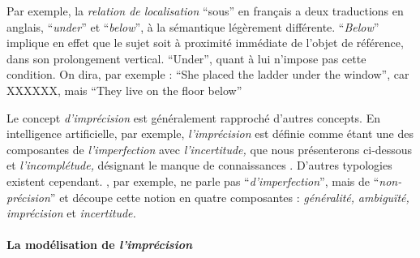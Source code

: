 Par exemple, la \emph{relation de localisation} \enquote{sous} en
français a deux traductions en anglais,
\foreignquote{english}{\emph{under}} et
\foreignquote{english}{\emph{below}}, à la sémantique légèrement
différente. \foreignquote{english}{\emph{Below}} implique en effet que
le sujet soit à proximité immédiate de l'objet de référence, dans son
prolongement vertical. \foreignquote{english}{Under}, quant à lui
n'impose pas cette condition. On dira, par exemple :
\foreignquote{english}{She placed the ladder under the window}, car
XXXXXX, mais \foreignquote{english}{They live on the floor below}



Le concept \emph{d'imprécision} est généralement rapproché d'autres
concepts. En intelligence artificielle, par exemple,
\emph{l'imprécision} est définie comme étant une des composantes de
\emph{l'imperfection} avec \emph{l'incertitude,} que nous présenterons
ci-dessous et \emph{l'incomplétude,} désignant le manque de
connaissances
\autocite{Bouchon-Meunier1995,Bouchon-Meunier2007}. D'autres
typologies existent cependant. \textcite{Niskanen1989}, par exemple,
ne parle pas \enquote{\emph{d'imperfection}}, mais de
\enquote{\emph{non-précision}} et découpe cette notion en quatre
composantes : \emph{généralité,} \emph{ambiguïté,} \emph{imprécision}
et \emph{incertitude.}

\paragraph{La modélisation de \emph{l'imprécision}}

